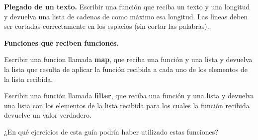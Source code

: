 \begin{ejercicio}
{\bf Plegado de un texto.} Escribir una función que reciba un texto y una
longitud y devuelva una lista de cadenas de como máximo esa longitud. Las
líneas deben ser cortadas correctamente en los espacios (sin cortar las
palabras).
\end{ejercicio}


\begin{ejercicio}
{\bf Funciones que reciben funciones.}
\begin{partes}
\item Escribir una funcion llamada {\bf map}, que reciba una función y una
lista y devuelva la lista que resulta de aplicar la función recibida a
cada uno de los elementos de la lista recibida.
\item Escribir una función llamada {\bf filter}, que reciba una función y
una lista y devuelva una lista con los elementos de la lista recibida para
los cuales la función recibida devuelve un valor verdadero.
\item ¿En qué ejercicios de esta guía podría haber utilizado estas
funciones?
\end{partes}
\end{ejercicio}

